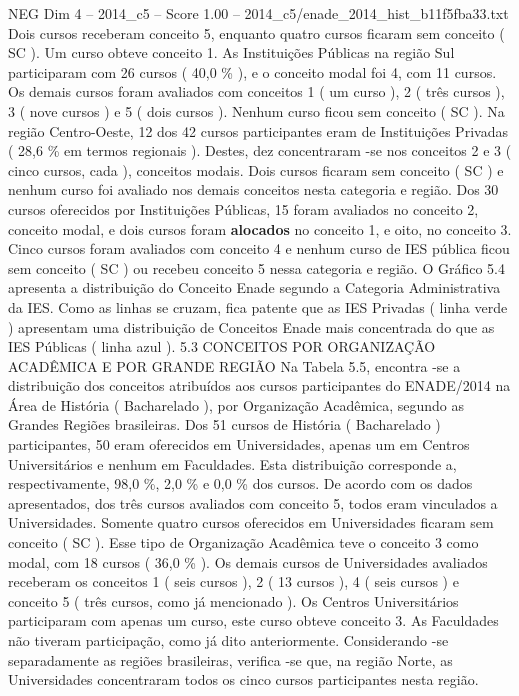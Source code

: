 \begin{textsample}{NEG Dim 4 – 2014\_c5 – Score 1.00 – 2014\_c5/enade\_2014\_hist\_b11f5fba33.txt}
Dois cursos receberam conceito 5, enquanto quatro cursos ficaram sem conceito ( SC ).
Um curso obteve conceito 1.
As Instituições Públicas na região Sul participaram com 26 cursos ( 40,0 \% ), e o conceito modal foi 4, com 11 cursos.
Os demais cursos foram avaliados com conceitos 1 ( um curso ), 2 ( três cursos ), 3 ( nove cursos ) e 5 ( dois cursos ).
Nenhum curso ficou sem conceito ( SC ).
Na região Centro-Oeste, 12 dos 42 cursos participantes eram de Instituições Privadas ( 28,6 \% em termos regionais ).
Destes, dez concentraram -se nos conceitos 2 e 3 ( cinco cursos, cada ), conceitos modais.
Dois cursos ficaram sem conceito ( SC ) e nenhum curso foi avaliado nos demais conceitos nesta categoria e região.
Dos 30 cursos oferecidos por Instituições Públicas, 15 foram avaliados no conceito 2, conceito modal, e dois cursos foram \textbf{alocados} no conceito 1, e oito, no conceito 3.
Cinco cursos foram avaliados com conceito 4 e nenhum curso de IES pública ficou sem conceito ( SC ) ou recebeu conceito 5 nessa categoria e região.
O Gráfico 5.4 apresenta a distribuição do Conceito Enade segundo a Categoria Administrativa da IES.
Como as linhas se cruzam, fica patente que as IES Privadas ( linha verde ) apresentam uma distribuição de Conceitos Enade mais concentrada do que as IES Públicas ( linha azul ). 5.3 CONCEITOS POR ORGANIZAÇÃO ACADÊMICA E POR GRANDE REGIÃO Na Tabela 5.5, encontra -se a distribuição dos conceitos atribuídos aos cursos participantes do ENADE/2014 na Área de História ( Bacharelado ), por Organização Acadêmica, segundo as Grandes Regiões brasileiras.
Dos 51 cursos de História ( Bacharelado ) participantes, 50 eram oferecidos em Universidades, apenas um em Centros Universitários e nenhum em Faculdades.
Esta distribuição corresponde a, respectivamente, 98,0 \%, 2,0 \% e 0,0 \% dos cursos.
De acordo com os dados apresentados, dos três cursos avaliados com conceito 5, todos eram vinculados a Universidades.
Somente quatro cursos oferecidos em Universidades ficaram sem conceito ( SC ).
Esse tipo de Organização Acadêmica teve o conceito 3 como modal, com 18 cursos ( 36,0 \% ).
Os demais cursos de Universidades avaliados receberam os conceitos 1 ( seis cursos ), 2 ( 13 cursos ), 4 ( seis cursos ) e conceito 5 ( três cursos, como já mencionado ).
Os Centros Universitários participaram com apenas um curso, este curso obteve conceito 3.
As Faculdades não tiveram participação, como já dito anteriormente.
Considerando -se separadamente as regiões brasileiras, verifica -se que, na região Norte, as Universidades concentraram todos os cinco cursos participantes nesta região.

\end{textsample}
